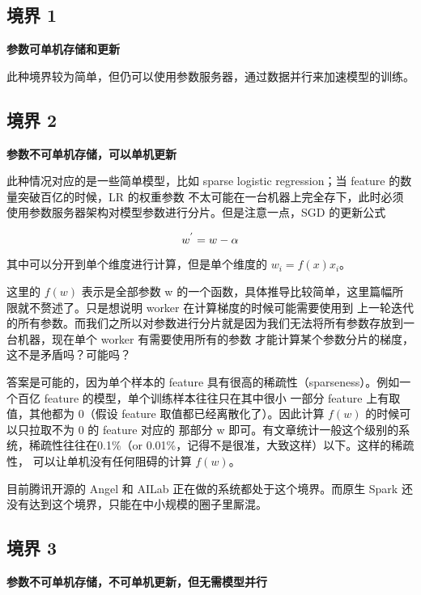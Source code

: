 \subsection{境界 1}\label{subsec:first}

\noindent\textbf{参数可单机存储和更新}

此种境界较为简单，但仍可以使用参数服务器，通过数据并行来加速模型的训练。

\subsection{境界 2}\label{subsec:second}

\noindent\textbf{参数不可单机存储，可以单机更新}

此种情况对应的是一些简单模型，比如 sparse logistic regression；当 feature 的数量突破百亿的时候，LR 的权重参数
不太可能在一台机器上完全存下，此时必须使用参数服务器架构对模型参数进行分片。但是注意一点，SGD 的更新公式

\begin{equation*}
w^{\rq} = w - \alpha
\end{equation*}

其中可以分开到单个维度进行计算，但是单个维度的 $w_i = f(x)x_i$。

这里的 $f(w)$ 表示是全部参数 w 的一个函数，具体推导比较简单，这里篇幅所限就不赘述了。只是想说明 worker 在计算梯度的时候可能需要使用到
上一轮迭代的所有参数。而我们之所以对参数进行分片就是因为我们无法将所有参数存放到一台机器，现在单个 worker 有需要使用所有的参数
才能计算某个参数分片的梯度，这不是矛盾吗？可能吗？

答案是可能的，因为单个样本的 feature 具有很高的稀疏性（sparseness）。例如一个百亿 feature 的模型，单个训练样本往往只在其中很小
一部分 feature 上有取值，其他都为 0（假设 feature 取值都已经离散化了）。因此计算 $f(w)$ 的时候可以只拉取不为 0 的 feature 对应的
那部分 w 即可。有文章统计一般这个级别的系统，稀疏性往往在0.1\%（or 0.01\%，记得不是很准，大致这样）以下。这样的稀疏性，
可以让单机没有任何阻碍的计算 $f(w)$。

目前腾讯开源的 Angel 和 AILab 正在做的系统都处于这个境界。而原生 Spark 还没有达到这个境界，只能在中小规模的圈子里厮混。

\subsection{境界 3}\label{subsec:third}

\noindent\textbf{参数不可单机存储，不可单机更新，但无需模型并行}

